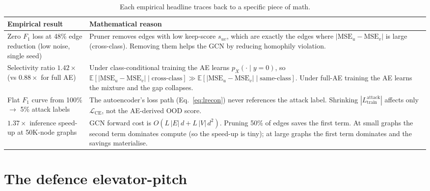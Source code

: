 \documentclass[11pt,a4paper]{article}
\begin{document}
\begin{table}[h]
\centering
\caption{Each empirical headline traces back to a specific piece of
math.}
\small
\renewcommand{\arraystretch}{1.4}
\begin{tabular}{p{6cm}p{8cm}}
\toprule
\textbf{Empirical result} & \textbf{Mathematical reason} \\
\midrule
Zero $F_1$ loss at 48\% edge reduction
(low noise, single seed)
& Pruner removes edges with low keep-score $s_{uv}$, which are exactly
the edges where $|\mathrm{MSE}_u - \mathrm{MSE}_v|$ is large
(cross-class). Removing them helps the GCN by reducing homophily
violation.\\
\hline
Selectivity ratio $1.42\times$ (vs $0.88\times$ for full AE)
& Under class-conditional training the AE learns
$p_X(\cdot\mid y=0)$, so
$\mathbb{E}[|\mathrm{MSE}_u-\mathrm{MSE}_v|\mid\text{cross-class}] \gg
\mathbb{E}[|\mathrm{MSE}_u-\mathrm{MSE}_v|\mid\text{same-class}]$.
Under full-AE training the AE learns the mixture and the gap collapses.\\
\hline
Flat $F_1$ curve from 100\% $\to$ 5\% attack labels
& The autoencoder's loss path
(Eq.~\eqref{eq:lrecon}) never references the attack label. Shrinking
$|L_{\text{train}}^{\text{attack}}|$ affects only $\mathcal{L}_{\text{CE}}$,
not the AE-derived OOD score.\\
\hline
$1.37\times$ inference speed-up at 50K-node graphs
& GCN forward cost is
$O(L\,|E|\,d + L\,|V|\,d^2)$.
Pruning 50\% of edges saves the first term. At small graphs the
second term dominates compute (so the speed-up is tiny); at large
graphs the first term dominates and the savings materialise.\\
\bottomrule
\end{tabular}
\end{table}

\section{The defence elevator-pitch}
\end{document}

